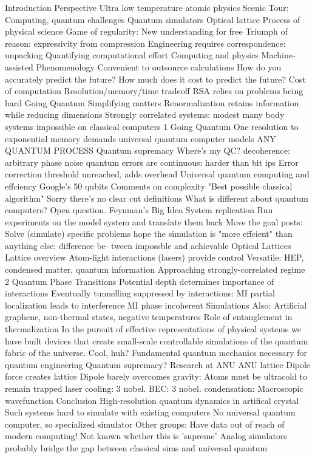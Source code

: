 {{{{{{ Introduction
Perspective
 Ultra low temperature atomic physics
 Scenic Tour: Computing, quantum challenges
 Quantum simulators
 Optical lattice
Process of physical science
 Game of regularity: New understanding for free
 Triumph of reason: expressivity from compression
 Engineering requires correspondence: unpacking
 Quantifying computational effort
Computing and physics
Machine-assisted Phenomenology
 Convenient to outsource calculations
 How do you accurately predict the future?
 How much does it cost to predict the future?
Cost of computation
 Resolution/memory/time tradeoff
 RSA relies on problems being hard
Going Quantum
Simplifying matters
 Renormalization retains information while reducing dimensions
 Strongly correlated systems: modest many body systems impossible on
classical computers
1
Going Quantum
 One resolution to exponential memory demands
 universal quantum computer models ANY QUANTUM PROCESS
Quantum supremacy
Where's my QC?
 decoherence: arbitrary phase noise
 quantum errors are continuous: harder than bit 
ips
 Error correction threshold unreached, adds overhead
 Universal quantum computing and effciency
 Google's 50 qubits
Comments on complexity
 "Best possible classical algorithm"
 Sorry there's no clear cut definitions
 What is different about quantum computers? Open question.
Feynman's Big Idea
 System replication
 Run experiments on the model system and translate them back
 Move the goal posts: Solve (simulate) specific problems
 hope the simulation is "more effcient" than anything else: difference be-
tween impossble and achievable
Optical Lattices
Lattice overview
 Atom-light interactions (lasers) provide control
 Versatile: HEP, condensed matter, quantum information
 Approaching strongly-correlated regime
2
Quantum Phase Transitions
 Potential depth determines importance of interactions
 Eventually tunnelling suppressed by interactions: MI
 partial localization leads to interference
 MI phase incoherent
Simulations
 Also: Artificial graphene, non-thermal states, negative temperatures
 Role of entanglement in thermalization
 In the pursuit of effective representations of physical systems we have built
devices that create small-scale controllable simulations of the quantum
fabric of the universe.
	Cool, huh?
 Fundamental quantum mechanics necessary for quantum engineering
Quantum supremacy?
Research at ANU
ANU lattice
 Dipole force creates lattice
 Dipole barely overcomes gravity: Atoms must be ultracold to remain
trapped
 laser cooling: 3 nobel.
	BEC: 3 nobel.
 condensation: Macroscopic wavefunction
Conclusion
 High-resolution quantum dynamics in artifical crystal
 Such systems hard to simulate with existing computers
 No universal quantum computer, so specialized simulator
 Other groups: Have data out of reach of modern computing!
 Not known whether this is 'supreme'
 Analog simulators probably bridge the gap between classical sims and
universal quantum



}}}}}}
